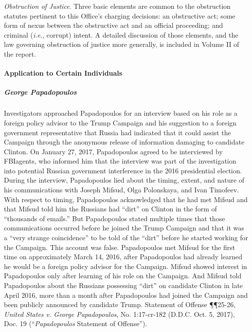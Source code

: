 \textit{Obstruction of Justice}.
Three basic elements are common to the obstruction statutes pertinent to this Office's charging decisions: an obstructive act; some form of nexus between the obstructive act and an official proceeding; and criminal (\textit{i.e.}, corrupt) intent. 
A detailed discussion of those elements, and the law governing obstruction of justice more generally, is included in Volume II of the report.

\paragraph{Application to Certain Individuals}

\subparagraph{George Papadopoulos}
Investigators approached Papadopoulos for an interview based on his role as a foreign policy advisor to the Trump Campaign and his suggestion to a foreign government representative that Russia had indicated that it could assist the Campaign through the anonymous release of information damaging to candidate Clinton. 
On January 27, 2017, Papadopoulos agreed to be interviewed by FBIagents, who informed him that the interview was part of the investigation into potential Russian government interference in the 2016 presidential election.
During the interview, Papadopoulos lied about the timing, extent, and nature of his communications with Joseph Mifsud, Olga Polonskaya, and Ivan Timofeev. 
With respect to timing, Papadopoulos acknowledged that he had met Mifsud and that Mifsud told him the Russians had ``dirt'' on Clinton in the form of ``thousands of emails.'' 
But Papadopoulos stated multiple times that those communications occurred before he joined the Trump Campaign and that it was a ``very strange coincidence'' to be told of the ``dirt'' before he started working for the Campaign. 
This account was false. 
Papadopoulos met Mifsud for the first time on approximately March 14, 2016, after Papadopoulos had already learned he would be a foreign policy advisor for the Campaign. 
Mifsud showed interest in Papadopoulos only after learning of his role on the Campaign. 
And Mifsud told Papadopoulos about the Russians possessing ``dirt'' on candidate Clinton in late April 2016, more than a month after Papadopoulos had joined the Campaign and been publicly announced by candidate Trump. 
Statement of Offense \P\P 25-26, \textit{United States v. George Papadopoulos}, No. 1:17-cr-182 (D.D.C. Oct. 5, 2017), Doc. 19 (``\textit{Papadopoulos} Statement of Offense'').

